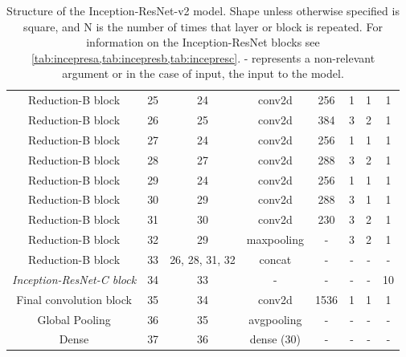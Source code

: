 \documentclass[12pt]{article}
\numberwithin{equation}{section}
\numberwithin{figure}{section}
\begin{document}
\begin{table}[]
{\begin{tabular}{c|c|c|c|c|c|c|c}
	Reduction-B block                 & 25               & 24             & conv2d            & 256              & 1              & 1                      & 1          \\
	Reduction-B block                 & 26               & 25             & conv2d            & 384              & 3              & 2                      & 1          \\
	Reduction-B block                 & 27               & 24             & conv2d            & 256              & 1              & 1                      & 1          \\
	Reduction-B block                 & 28               & 27             & conv2d            & 288              & 3              & 2                      & 1          \\
	Reduction-B block                 & 29               & 24             & conv2d            & 256              & 1              & 1                      & 1          \\
	Reduction-B block                 & 30               & 29             & conv2d            & 288              & 3              & 1                      & 1          \\
	Reduction-B block                 & 31               & 30             & conv2d            & 230              & 3              & 2                      & 1          \\
	Reduction-B block                 & 32               & 29             & maxpooling        & -                & 3              & 2                      & 1          \\
	Reduction-B block                 & 33               & 26, 28, 31, 32 & concat            & -                & -              & -                      & -          \\\hdashline
	\textit{Inception-ResNet-C block} & 34               & 33             & -                 & -                & -              & -                      & 10         \\\hdashline
	Final convolution block           & 35               & 34             & conv2d            & 1536             & 1              & 1                      & 1          \\
	Global Pooling                    & 36               & 35             & avgpooling        & -                & -              & -                      & -          \\
	Dense                             & 37               & 36             & dense (30)        & -                & -              & - 				& -          \\ \hline
	\end{tabular}%
	}
	\caption{Structure of the Inception-ResNet-v2 model. Shape unless otherwise specified is square, and N is the number of times that layer or block is repeated. For information on the Inception-ResNet blocks see \cref{tab:incepresa,tab:incepresb,tab:incepresc}.  - represents a non-relevant argument or in the case of input, the input to the model.}
	\label{tab:incepresfull}
	\end{table}
\end{document}
